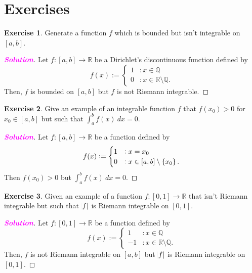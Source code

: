 \documentclass[12pt,openany]{book}
\theoremstyle{definition}
\newtheorem{exercise}{Exercise}[chapter]
\newcommand{\Q}{\mathbb{Q}}
\newcommand{\R}{\mathbb{R}}
\newcommand{\sol}{\textcolor{magenta}{\bf Solution}}
\begin{document}
	\newpage
	\section{Exercises}
	\begin{tcolorbox}[colframe=execolor, title={\color{white}\bf}]
		\begin{exercise}
			Generate a function $f$ which is bounded but isn’t integrable on $[a,b]$.
		\end{exercise}
	\end{tcolorbox}
	\begin{proof}[\sol]
		Let $f:[a,b]\to\R$ be a Dirichlet's discontinuous function defined by \[
		f(x):=\begin{cases}
			1 &:x\in\Q\\
			0 &:x\in\R\setminus\Q.
		\end{cases}
		\] Then, $f$ is bounded on $[a,b]$ but $f$ is not Riemann integrable.
	\end{proof}
	\vspace{7pt}
	\begin{tcolorbox}[colframe=execolor, title={\color{white}\bf}]
		\begin{exercise}
			Give an example of an integrable function $f$ that $f(x_0)>0$ for $x_0\in[a,b]$ but such that $\displaystyle\int_a^bf(x)\ dx=0$.
		\end{exercise}
	\end{tcolorbox}
	\begin{proof}[\sol]
		Let $f:[a,b]\to\R$ be a function defined by \[
		f(x):=\begin{cases}
			1 &:x=x_0\\
			0 &:x\in[a,b]\setminus\set{x_0}.
		\end{cases} 
		\] Then $f(x_0)>0$ but $\displaystyle\int_a^bf(x)\ dx = 0$.
	\end{proof}
	\vspace{7pt}
	\begin{tcolorbox}[colframe=execolor, title={\color{white}\bf}]
		\begin{exercise}
			Given an example of a function $f:[0,1]\to\R$ that isn't Riemann integrable but such that $\abs{f}$ is Riemann integrable on $[0,1]$.
		\end{exercise}
	\end{tcolorbox}
	\begin{proof}[\sol]
		Let $f:[0,1]\to\R$ be a function defined by \[
		f(x):=\begin{cases}
			1 &:x\in\Q\\
			-1 &:x\in\R\setminus\Q.
		\end{cases}
		\] Then, $f$ is not Riemann integrable on $[a,b]$ but $\abs{f}$ is Riemann integrable on $[0,1]$.
	\end{proof}
\end{document}
